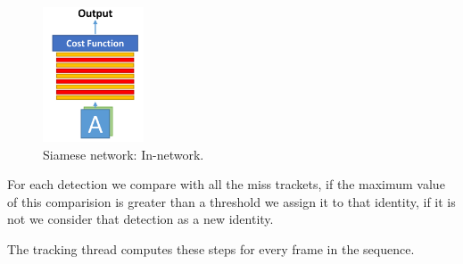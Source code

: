 \begin{figure}[hptb]
\centering         
\includegraphics[width=3cm]{siamese/retall3.png}
\caption{Siamese network: In-network.} \label{saimss}
\end{figure}


For each detection we compare with all the miss trackets, if the maximum value of this  comparision is greater than a threshold we assign it to that identity, if it is not we consider that detection as a new identity.


The tracking thread computes these steps for every frame in the sequence.
